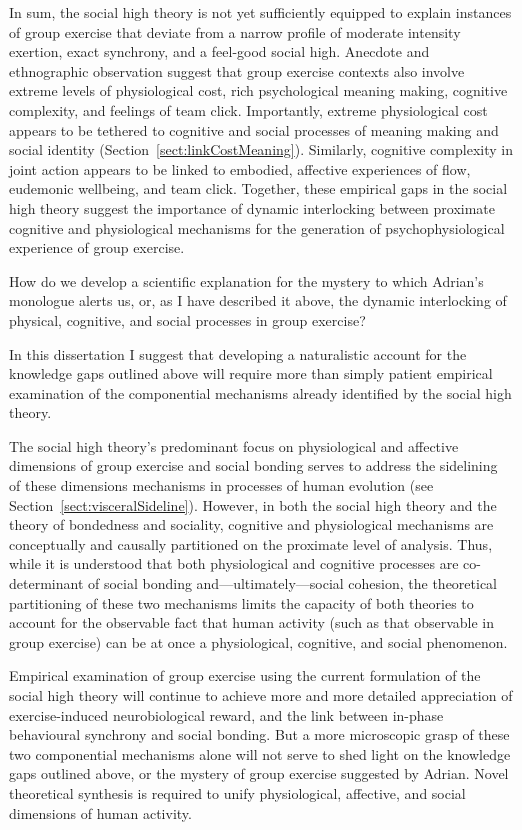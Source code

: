 \begin{CJK}{UTF8}{gbsn}
In sum, the social high theory is not yet sufficiently equipped to explain instances of group exercise that deviate from a narrow profile of moderate intensity exertion, exact synchrony, and a feel-good social high.  Anecdote and ethnographic observation suggest that group exercise contexts also involve extreme levels of physiological cost, rich psychological meaning making, cognitive complexity, and feelings of team click.  Importantly, extreme physiological cost appears to be tethered to cognitive and social processes of meaning making and social identity (Section~\ref{sect:linkCostMeaning}).  Similarly, cognitive complexity in joint action appears to be linked to embodied, affective experiences of flow, eudemonic wellbeing, and team click.  Together, these empirical gaps in the social high theory suggest the importance of dynamic interlocking between proximate cognitive and physiological mechanisms for the generation of psychophysiological experience of group exercise.

How do we develop a scientific explanation for the mystery to which Adrian's monologue alerts us, or, as I have described it above, the  dynamic interlocking of physical, cognitive, and social processes in group exercise?


In this dissertation I suggest that developing a naturalistic account for the knowledge gaps outlined above will require more than simply patient empirical examination of the componential mechanisms already identified by the social high theory.

The social high theory's predominant focus on physiological and affective dimensions of group exercise and social bonding serves to address the sidelining of these dimensions mechanisms in processes of human evolution (see Section~\ref{sect:visceralSideline}).  However, in both the social high theory and the theory of bondedness and sociality, cognitive and physiological mechanisms are conceptually and causally partitioned on the proximate level of analysis. Thus, while it is understood that both physiological and cognitive processes are co-determinant of social bonding and---ultimately---social cohesion, the theoretical partitioning of these two mechanisms limits the capacity of both theories to account for the observable fact that human activity (such as that observable in group exercise) can be at once a physiological, cognitive, and social phenomenon.

Empirical examination of group exercise using the current formulation of the social high theory will continue to achieve more and more detailed appreciation of exercise-induced neurobiological reward, and the link between in-phase behavioural synchrony and social bonding. But a more microscopic grasp of these two componential mechanisms alone will not serve to shed light on the knowledge gaps outlined above, or the mystery of group exercise suggested by Adrian.  Novel theoretical synthesis is required to unify physiological, affective, and social dimensions of human activity.


\end{CJK}
